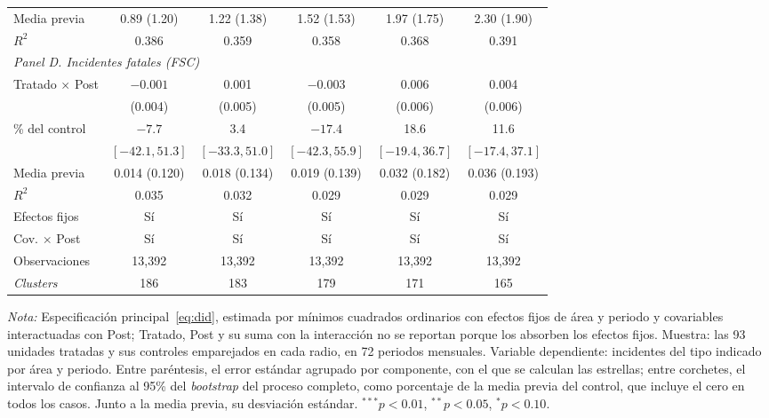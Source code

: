 \begin{table}[htbp]
\begin{tabular}{l c c c c c}
        Media previa & 0.89 (1.20) & 1.22 (1.38) & 1.52 (1.53) & 1.97 (1.75) & 2.30 (1.90) \\
        $R^2$ & 0.386 & 0.359 & 0.358 & 0.368 & 0.391 \\
        \midrule
        \multicolumn{6}{l}{\textit{Panel D. Incidentes fatales (FSC)}} \\
        Tratado $\times$ Post & $-0.001$ & 0.001 & $-0.003$ & 0.006 & 0.004 \\
         & (0.004) & (0.005) & (0.005) & (0.006) & (0.006) \\
        \% del control & $-7.7$ & 3.4 & $-17.4$ & 18.6 & 11.6 \\
         & $[-42.1, 51.3]$ & $[-33.3, 51.0]$ & $[-42.3, 55.9]$ & $[-19.4, 36.7]$ & $[-17.4, 37.1]$ \\
        Media previa & 0.014 (0.120) & 0.018 (0.134) & 0.019 (0.139) & 0.032 (0.182) & 0.036 (0.193) \\
        $R^2$ & 0.035 & 0.032 & 0.029 & 0.029 & 0.029 \\
        \midrule
        Efectos fijos & Sí & Sí & Sí & Sí & Sí \\
        Cov. $\times$ Post & Sí & Sí & Sí & Sí & Sí \\
        Observaciones & 13,392 & 13,392 & 13,392 & 13,392 & 13,392 \\
        \emph{Clusters} & 186 & 183 & 179 & 171 & 165 \\
        \bottomrule
    \end{tabular}
    \begin{minipage}{0.95\linewidth}\linespread{1}\selectfont
        \vspace{0.4em}
        \scriptsize \textit{Nota:} Especificación principal~\eqref{eq:did}, estimada por mínimos cuadrados ordinarios con efectos fijos de área y periodo y covariables interactuadas con Post; Tratado, Post y su suma con la interacción no se reportan porque los absorben los efectos fijos. Muestra: las 93 unidades tratadas y sus controles emparejados en cada radio, en 72 periodos mensuales. Variable dependiente: incidentes del tipo indicado por área y periodo. Entre paréntesis, el error estándar agrupado por componente, con el que se calculan las estrellas; entre corchetes, el intervalo de confianza al 95\% del \emph{bootstrap} del proceso completo, como porcentaje de la media previa del control, que incluye el cero en todos los casos. Junto a la media previa, su desviación estándar. ${}^{***} p<0.01$, ${}^{**} p<0.05$, ${}^{*} p<0.10$.
    \end{minipage}
\end{table}

